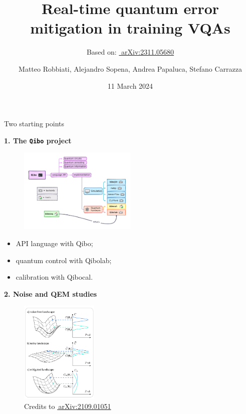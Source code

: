 \documentclass[8pt, xcolor={svgnames}, hyperref={linkcolor=black}, aspectratio=169]{beamer}
\title{Real-time quantum error mitigation in training VQAs}
\date{11 March 2024}
\author[Matteo Robbiati, Alejandro Sopena, Andrea Papaluca, Stefano Carrazza]{Matteo Robbiati, Alejandro Sopena, Andrea Papaluca, Stefano Carrazza}
\subtitle{Based on: \href{https://arxiv.org/abs/2311.05680}{\faBook\,\,arXiv:2311.05680}}
\begin{document}
\maketitle


\begin{frame}{Two starting points}
\pause
\begin{multicols}{2}
\textbf{1. The \texttt{Qibo} project}
\vspace{-0.6cm}
\begin{figure}
\includegraphics[width=0.5\textwidth, height=0.62\textheight]{figures/compact_ecosystem.pdf}
\end{figure}
\pause
\vspace{-0.3cm}
\begin{tcolorbox}[colback=red!15, title= Full-stack framework]
\begin{itemize}[noitemsep]
\item[\faCode] API language with Qibo;
\item[\faCog] quantum control with Qibolab;
\item[\faCrosshairs] calibration with Qibocal.
\end{itemize}
\end{tcolorbox}
\pause
\textbf{2. Noise and QEM studies}
\begin{figure}
\includegraphics[width=0.33\textwidth, height=0.72\textheight]{figures/NIBP_cropped.pdf}
\caption*{Credits to \href{https://arxiv.org/abs/2109.01051}{\faBook\,arXiv:2109.01051}}
\end{figure}
\end{multicols}
\end{frame}
\end{document}
